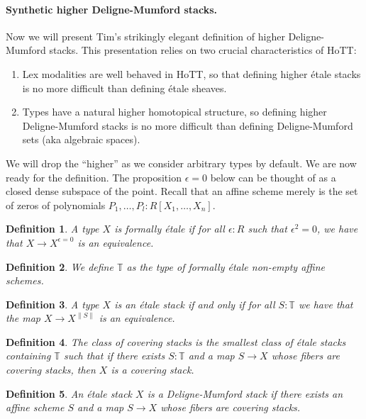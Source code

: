 \documentclass[letterpaper]{../../util/easychair}
\newtheorem{definition}{Definition}
\newcommand{\propTrunc}[1]{\lVert #1 \rVert}
\begin{document}
\paragraph*{Synthetic higher Deligne-Mumford stacks.}

Now we will present Tim's strikingly elegant definition of higher Deligne-Mumford stacks. This presentation relies on two crucial characteristics of HoTT:
\begin{enumerate}
\item Lex modalities are well behaved in HoTT, so that defining higher étale stacks is no more difficult than defining étale sheaves.
\item Types have a natural higher homotopical structure, so defining higher Deligne-Mumford stacks is no more difficult than defining Deligne-Mumford sets (aka algebraic spaces). 
\end{enumerate}

We will drop the ``higher'' as we consider arbitrary types by default. We are now ready for the definition. The proposition \(\epsilon=0\) below can be thought of as a closed dense subspace of the point.
Recall that an affine scheme merely is the set of zeros of polynomials \(P_1,\dots,P_l:R[X_1,\dots,X_n]\).

\begin{definition}
A type $X$ is formally étale if for all $\epsilon:R$ such that $\epsilon^2=0$, we have that $X\to X^{\epsilon=0}$ is an equivalence.
\end{definition}

\begin{definition}
We define $\mathbb{T}$ as the type of formally \'etale non-empty affine schemes.
\end{definition}


\begin{definition}
A type $X$ is an étale stack if and only if for all $S:\mathbb{T}$ we have that the map $X\to X^{\propTrunc{S}}$ is an equivalence.
\end{definition}

\begin{definition}
The class of covering stacks is the smallest class of étale stacks containing $\mathbb{T}$ such that if there exists $S:\mathbb{T}$ and a map $S\to X$ whose fibers are covering stacks, then $X$ is a covering stack.
\end{definition}

\begin{definition}
An étale stack $X$ is a Deligne-Mumford stack if there exists an affine scheme $S$ and a map $S\to X$ whose fibers are covering stacks.
\end{definition}
\end{document}
